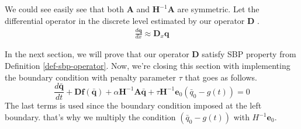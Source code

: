 \documentclass{article}
\theoremstyle{definition}
\begin{document}
    We could see easily see that both $\mathbf{A}$ and $\mathbf{H}^{-1}\mathbf{A}$ are {symmetric}. 
    Let the differential operator in the discrete level estimated by our operator $\mathbf{D}$ .
    \begin{align}
        \label{SBP-operator-FV}
        \frac{d\mathbf{q}}{dx}  \approx \mathbf{D}_x \mathbf{q}
    \end{align}
     
    In the next section, we will prove that our operator $\mathbf{D}$ satisfy SBP property from Definition \ref{def-sbp-operator}. 
    Now, we're closing this section with implementing the boundary condition with penalty parameter $\tau$ that goes as follows. 
    \begin{equation}\label{semidiscrete}
        \frac{d\bar{\mathbf{q}}}{dt} + \mathbf{D}\mathbf{f}(\bar{\mathbf{q}}) 
            + \alpha \mathbf{H}^{-1}\mathbf{A}\bar{\mathbf{q}} + \tau \mathbf{H}^{-1} \mathbf{e}_0(\bar{{q}}_0  - g(t)) = 0
    \end{equation}
    The last terms is used since the boundary condition imposed at the left boundary. that's why we multiply the condition $(\bar{{q}}_0  - g(t))$
    with  $H^{-1} \mathbf{e}_0$. 
\end{document}
